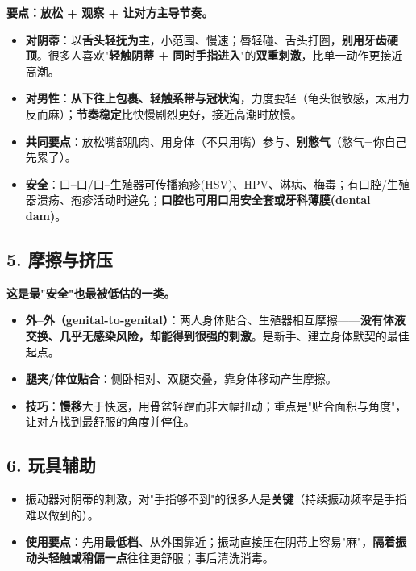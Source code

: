\documentclass[12pt,UTF8,openany]{ctexbook}
\begin{document}
\textbf{要点：放松 + 观察 + 让对方主导节奏。}

\begin{itemize}[leftmargin=2em,itemsep=0.3em]
  \item \textbf{对阴蒂}：以\textbf{舌头轻抚为主}，小范围、慢速；唇轻碰、舌头打圈，\textbf{别用牙齿硬顶}。很多人喜欢"\textbf{轻触阴蒂 + 同时手指进入}"的\textbf{双重刺激}，比单一动作更接近高潮。
  \item \textbf{对男性}：\textbf{从下往上包裹、轻触系带与冠状沟}，力度要轻（龟头很敏感，太用力反而麻）；\textbf{节奏稳定}比快慢剧烈更好，接近高潮时放慢。
  \item \textbf{共同要点}：放松嘴部肌肉、用身体（不只用嘴）参与、\textbf{别憋气}（憋气=你自己先累了）。
  \item \textbf{安全}：口--口/口--生殖器可传播疱疹(HSV)、HPV、淋病、梅毒；有口腔/生殖器溃疡、疱疹活动时避免；\textbf{口腔也可用口用安全套或牙科薄膜(dental dam)}。
\end{itemize}

\subsection*{5. 摩擦与挤压}

\textbf{这是最"安全"也最被低估的一类。}

\begin{itemize}[leftmargin=2em,itemsep=0.3em]
  \item \textbf{外--外（genital-to-genital）}：两人身体贴合、生殖器相互摩擦——\textbf{没有体液交换、几乎无感染风险，却能得到很强的刺激}。是新手、建立身体默契的最佳起点。
  \item \textbf{腿夹/体位贴合}：侧卧相对、双腿交叠，靠身体移动产生摩擦。
  \item \textbf{技巧}：\textbf{慢移}大于快速，用骨盆轻蹭而非大幅扭动；重点是"贴合面积与角度"，让对方找到最舒服的角度并停住。
\end{itemize}

\subsection*{6. 玩具辅助}

\begin{itemize}[leftmargin=2em,itemsep=0.3em]
  \item 振动器对阴蒂的刺激，对"手指够不到"的很多人是\textbf{关键}（持续振动频率是手指难以做到的）。
  \item \textbf{使用要点}：先用\textbf{最低档}、从外围靠近；振动直接压在阴蒂上容易"麻"，\textbf{隔着振动头轻触或稍偏一点}往往更舒服；事后清洗消毒。
\end{itemize}
\end{document}
